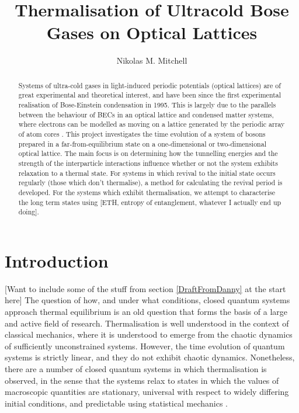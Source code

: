 \documentclass[a4paper, 10pt]{article}
\title{Thermalisation of Ultracold Bose Gases on Optical Lattices}
\author{Nikolas M. Mitchell}
\theoremstyle{plain}
\begin{document}
\maketitle

\begin{abstract}
    Systems of ultra-cold gases in light-induced periodic potentials (optical
    lattices) are of great experimental and theoretical interest, and have been
    since the first experimental realisation of Bose-Einstein condensation in
    1995. This is largely due to the parallels between the behaviour of BECs in
    an optical lattice and condensed matter systems, where electrons can be
    modelled as moving on a lattice generated by the periodic array of atom
    cores \cite{Bloch2012}. This project investigates the time evolution of a
    system of bosons prepared in a far-from-equilibrium state on a
    one-dimensional or two-dimensional optical lattice. The main focus is on
    determining how the tunnelling energies and the strength of the
    interparticle interactions influence whether or not the system exhibits
    relaxation to a thermal state. For systems in which revival to the initial
    state occurs regularly (those which don't thermalise), a method for
    calculating the revival period is developed. For the systems which exhibit
    thermalisation, we attempt to characterise the long term states using [ETH,
    entropy of entanglement, whatever I actually end up doing].
\end{abstract}
\newpage
\section{Introduction}
[Want to include some of the stuff from section \ref{DraftFromDanny} at the
start here]
The question of how, and under what conditions, closed quantum systems approach
thermal equilibrium is an old question that forms the basis of a large and
active field of research. Thermalisation is well understood in the context
of classical mechanics, where it is understood  to emerge from the chaotic
dynamics of sufficiently unconstrained systems. However, the time evolution of
quantum systems is strictly linear, and  they do not exhibit chaotic
dynamics. Nonetheless, there are a number of closed quantum systems in which
thermalisation is observed, in the sense that the systems relax to states in
which the values of macroscopic quantities are stationary, universal with
respect to widely differing initial conditions, and predictable using
statistical mechanics \cite{Rigol2008}.
\end{document}
